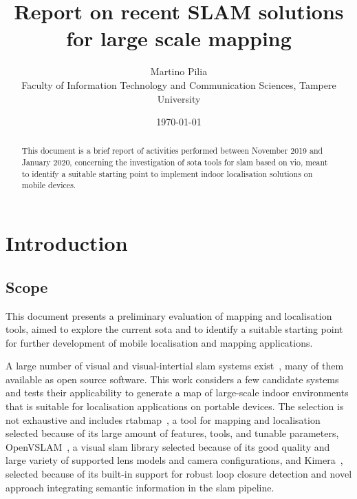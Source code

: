 \documentclass[11pt, letterpaper, twoside]{article}
\title{Report on recent SLAM solutions for large scale mapping}
\author{Martino Pilia\\{\small Faculty of Information
Technology and Communication Sciences, Tampere University}}
\date{\today}
\begin{document}
\maketitle

\begin{abstract}
    This document is a brief report of activities performed between November 2019
    and January 2020, concerning the investigation of \gls{sota} tools
    for \gls{slam} based on \gls{vio}, meant to identify a suitable starting point
    to implement indoor localisation solutions on mobile devices.
\end{abstract}

\newpage

\tableofcontents

\newpage

\glsfindwidesttoplevelname[\acronymtype]
\printglossary[type=\acronymtype,style=alttree,title=Abbreviations,nonumberlist]

\newpage

\section{Introduction}

\subsection{Scope}

This document presents a preliminary evaluation of mapping and localisation
tools, aimed to explore the current \gls{sota} and to identify a suitable
starting point for further development of mobile localisation and mapping
applications.

A large number of visual and visual-intertial \gls{slam} systems
exist~\cite{huang2019survey}, many of them available as open source software.
This work considers a few candidate systems and tests their applicability to
generate a map of large-scale indoor environments that is suitable for
localisation applications on portable devices. The selection is not exhaustive
and includes \gls{rtabmap}~\cite{labbe2019rtab}, a tool for mapping and
localisation selected because of its large amount of features, tools, and
tunable parameters, OpenVSLAM~\cite{openvslam2019}, a visual \gls{slam} library
selected because of its good quality and large variety of supported lens models
and camera configurations, and Kimera~\cite{rosinol2019kimera}, selected
because of its built-in support for robust loop closure detection and novel
approach integrating semantic information in the \gls{slam} pipeline.
\end{document}

